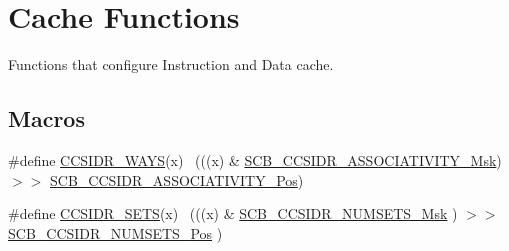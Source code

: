 \hypertarget{group___c_m_s_i_s___core___cache_functions}{}\section{Cache Functions}
\label{group___c_m_s_i_s___core___cache_functions}


Functions that configure Instruction and Data cache.  


\subsection*{Macros}
\begin{DoxyCompactItemize}
\item 
\#define \hyperlink{group___c_m_s_i_s___core___cache_functions_gaeff603706e37ac885d83ff55fa4c1534}{C\+C\+S\+I\+D\+R\+\_\+\+W\+A\+YS}(x)              ~(((x) \& \hyperlink{group___c_m_s_i_s___s_c_b_gae093c4c635dad43845967512fa87173a}{S\+C\+B\+\_\+\+C\+C\+S\+I\+D\+R\+\_\+\+A\+S\+S\+O\+C\+I\+A\+T\+I\+V\+I\+T\+Y\+\_\+\+Msk}) $>$$>$ \hyperlink{group___c_m_s_i_s___s_c_b_gae67f2f83976b819fb3039fc35cfef0fb}{S\+C\+B\+\_\+\+C\+C\+S\+I\+D\+R\+\_\+\+A\+S\+S\+O\+C\+I\+A\+T\+I\+V\+I\+T\+Y\+\_\+\+Pos})
\item 
\#define \hyperlink{group___c_m_s_i_s___core___cache_functions_gacb5e60cf472a852ca423cdb91cd49007}{C\+C\+S\+I\+D\+R\+\_\+\+S\+E\+TS}(x)              ~(((x) \& \hyperlink{group___c_m_s_i_s___s_c_b_ga47d1f01185d7a039334031008386c5a8}{S\+C\+B\+\_\+\+C\+C\+S\+I\+D\+R\+\_\+\+N\+U\+M\+S\+E\+T\+S\+\_\+\+Msk}      ) $>$$>$ \hyperlink{group___c_m_s_i_s___s_c_b_ga1028d2c238f74d2aa021f53ffbe8d7ab}{S\+C\+B\+\_\+\+C\+C\+S\+I\+D\+R\+\_\+\+N\+U\+M\+S\+E\+T\+S\+\_\+\+Pos}      )
\end{DoxyCompactItemize}
